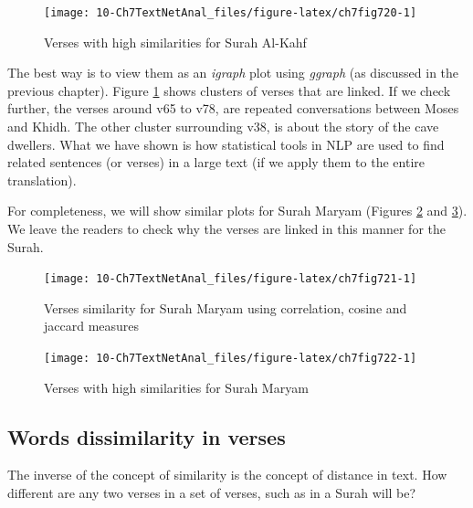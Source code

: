 \documentclass[
]{article}
\begin{document}
\begin{figure}

{\centering \texttt{[image: 10-Ch7TextNetAnal\_files/figure-latex/ch7fig720-1]} 

}

\caption{Verses with high similarities for Surah Al-Kahf}\label{fig:ch7fig720}
\end{figure}

The best way is to view them as an \emph{igraph} plot using \emph{ggraph} (as discussed in the previous chapter). Figure \ref{fig:ch7fig720} shows clusters of verses that are linked. If we check further, the verses around v65 to v78, are repeated conversations between Moses and Khidh. The other cluster surrounding v38, is about the story of the cave dwellers. What we have shown is how statistical tools in NLP are used to find related sentences (or verses) in a large text (if we apply them to the entire translation).

For completeness, we will show similar plots for Surah Maryam (Figures \ref{fig:ch7fig721} and \ref{fig:ch7fig722}). We leave the readers to check why the verses are linked in this manner for the Surah.

\begin{figure}

{\centering \texttt{[image: 10-Ch7TextNetAnal\_files/figure-latex/ch7fig721-1]} 

}

\caption{Verses similarity for Surah Maryam using correlation, cosine and jaccard measures}\label{fig:ch7fig721}
\end{figure}

\begin{figure}

{\centering \texttt{[image: 10-Ch7TextNetAnal\_files/figure-latex/ch7fig722-1]} 

}

\caption{Verses with high similarities for Surah Maryam}\label{fig:ch7fig722}
\end{figure}

\hypertarget{words-dissimilarity-in-verses}{%
\subsection{Words dissimilarity in verses}\label{words-dissimilarity-in-verses}}

The inverse of the concept of similarity is the concept of distance in text. How different are any two verses in a set of verses, such as in a Surah will be?
\end{document}

